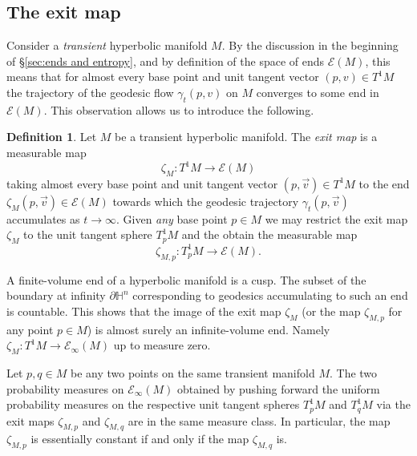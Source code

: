 \documentclass{amsart}
\newcommand{\HH}{\mathbb{H}}
\newcommand{\Ends}[1]{\mathcal{E}\left(#1\right)}
\newcommand{\EndsInf}[1]{\mathcal{E}_{\infty}\left(#1\right)}
\theoremstyle{plain}
\numberwithin{equation}{section}
\theoremstyle{definition}
\newtheorem{definition}[theorem]{Definition}
\begin{document}
\subsection{The exit map}
\label{sub:exit map}

Consider a \emph{transient} hyperbolic manifold $M$. By the discussion in the beginning of \S\ref{sec:ends and entropy}, and by definition of the space of ends $\Ends{M}$, this means that for almost every base point and unit tangent vector $(p,v) \in T^1M$ the trajectory of the geodesic flow $\gamma_t(p,v)$  on $M$ converges to some end in $\Ends{M}$. This observation allows us to introduce the following.


\begin{definition}
\label{def:exit map}
Let $M$ be a transient hyperbolic manifold. The \emph{exit map} is a measurable map
$$\zeta_M : T^1M \to \Ends{M}$$ 
taking almost every base point and unit tangent vector $(p,\vec v) \in T^1 M$ to the end $\zeta_M(p,\vec v) \in \Ends{M}$ towards which the geodesic trajectory $\gamma_t(p,\vec v)$ accumulates as $t \to \infty$. Given \emph{any} base point $p \in M$ we may restrict the exit map $\zeta_M$ to the unit tangent sphere $T^1_pM$ and the obtain the measurable map $$\zeta_{M,p} : T^1_p M \to \Ends{M}.$$
\end{definition}

A finite-volume end of a hyperbolic manifold is a cusp. The subset of the boundary at infinity $\partial \HH^n$ corresponding to geodesics accumulating to such an end is countable. This shows that the image of the exit map $\zeta_M$ (or the map $\zeta_{M,p}$ for any point $p \in M$) is almost surely an infinite-volume end. Namely $\zeta_M : T^1 M \to \EndsInf{M}$ up to measure zero.

Let $p,q \in M$ be any two points on the same transient manifold $M$. The two probability measures on $\EndsInf{M}$ obtained by pushing forward the uniform probability measures on the respective unit tangent spheres $T^1_pM$ and $T^1_qM$ via the exit maps $\zeta_{M,p}$ and $\zeta_{M,q}$ are in the same measure class. In particular, the map $\zeta_{M,p}$ is essentially constant if and only if the map $\zeta_{M,q}$ is. 
\end{document}
